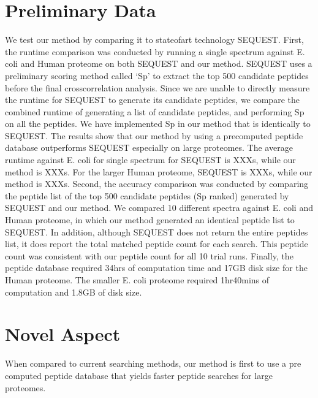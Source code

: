 \documentclass[12pt]{article}
\begin{document}
\section{Preliminary Data}

We test our method by comparing it to stateofart technology
SEQUEST. First, the  runtime comparison was conducted by running a
single spectrum against E. coli and  Human proteome on both SEQUEST
and our method. SEQUEST uses a preliminary  scoring method called `Sp'
to extract the top 500 candidate peptides before the final
crosscorrelation analysis. Since we are unable to directly measure the
runtime for SEQUEST to generate its candidate peptides, we compare the
combined runtime of  generating a list of candidate peptides, and
performing Sp on all the peptides. We have  implemented Sp in our
method that is identically to SEQUEST. The results show that  our
method by using a precomputed peptide database outperforms SEQUEST
especially on large proteomes. The average runtime against E. coli for
single spectrum  for SEQUEST is XXXs, while our method is XXXs. For
the larger Human proteome,  SEQUEST is XXXs, while our method is XXXs.
Second, the accuracy comparison was conducted by comparing the peptide
list of  the top 500 candidate peptides (Sp ranked) generated by
SEQUEST and our method.  We compared 10 different spectra against
E. coli and Human proteome, in which our  method generated an
identical peptide list to SEQUEST. In addition, although  SEQUEST does
not return the entire peptides list, it does report the total matched
peptide count for each search. This peptide count was consistent with
our peptide  count for all 10 trial runs. Finally, the peptide
database required 34hrs of computation time and 17GB disk  size for
the Human proteome. The smaller E. coli proteome required 1hr40mins of
computation and 1.8GB of disk size.

\section{Novel Aspect}

When compared to current searching methods, our method is first to use
a pre computed peptide database that yields faster peptide searches
for large proteomes.
\end{document}
